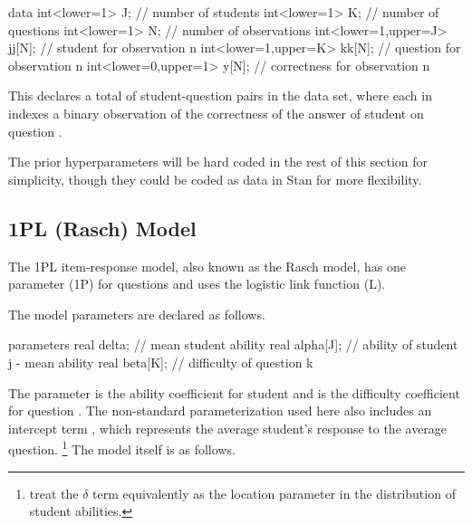 \begin{stancode}
data {
  int<lower=1> J;              // number of students
  int<lower=1> K;              // number of questions
  int<lower=1> N;              // number of observations
  int<lower=1,upper=J> jj[N];  // student for observation n
  int<lower=1,upper=K> kk[N];  // question for observation n
  int<lower=0,upper=1> y[N];   // correctness for observation n
}
\end{stancode}
%
This declares a total of  student-question pairs in the data
set, where each  in  indexes a binary observation
 of the correctness of the answer of student 
on question .

The prior hyperparameters will be hard coded in the rest of this
section for simplicity, though they could be coded as data in
Stan for more flexibility.

\subsection{1PL (Rasch) Model}

The 1PL item-response model, also known as the Rasch model, has one
parameter (1P) for questions and uses the logistic link function (L).%
%


The model parameters are declared as follows.
%

\begin{stancode}
parameters {    
  real delta;         // mean student ability
  real alpha[J];      // ability of student j - mean ability
  real beta[K];       // difficulty of question k
}
\end{stancode}
%
The parameter  is the ability coefficient for student
 and  is the difficulty coefficient for question
.  The non-standard parameterization used here also includes
an intercept term , which represents the average student's
response to the average question.%
%
\footnote{\citep{GelmanHill:2007} treat the $\delta$ term equivalently
  as the location parameter in the distribution of student abilities.}
%
The model itself is as follows.
%

